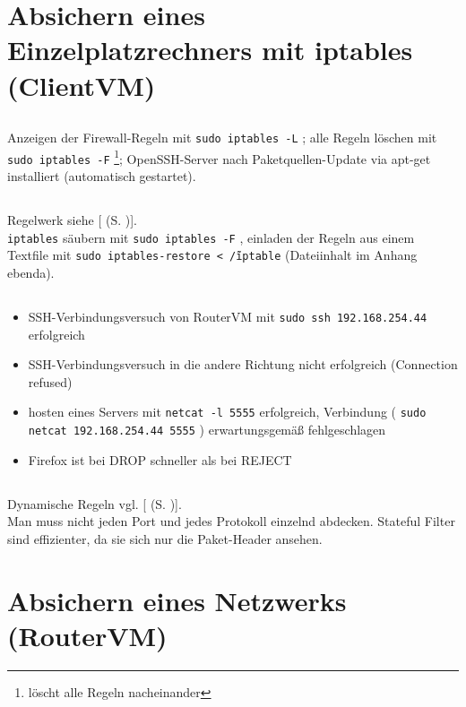 \documentclass[twoside]{article}
\newcommand{\ttt}[1]{%
	\texttt{#1}%
}
\newcommand{\mref}[1]{[\nameref{#1} (S. \pageref{#1})]}
\begin{document}
\section{Absichern eines Einzelplatzrechners mit iptables (ClientVM)}
\label{sec:securing-workplace}
	\subsection{}
	\label{ssec:2.1}
	Anzeigen der Firewall-Regeln mit \ttt{sudo iptables -L}; alle Regeln löschen mit \ttt{sudo iptables -F}\footnote{löscht alle Regeln nacheinander}; OpenSSH-Server nach Paketquellen-Update via apt-get installiert (automatisch gestartet).
	\subsection{}
	\label{ssec:2.2}
	Regelwerk siehe \mref{2.2-1}.\\
	\ttt{iptables} säubern mit \ttt{sudo iptables -F}, einladen der Regeln aus einem Textfile mit \ttt{sudo iptables-restore < \~/iptable} (Dateiinhalt im Anhang ebenda).
	\subsection{}
	\label{ssec:2.3}
	\begin{itemize}
		\item SSH-Verbindungsversuch von RouterVM mit \ttt{sudo ssh 192.168.254.44} erfolgreich
		\item SSH-Verbindungsversuch in die andere Richtung nicht erfolgreich (Connection refused)
		\item hosten eines Servers mit \ttt{netcat -l 5555} erfolgreich, Verbindung (\ttt{sudo netcat 192.168.254.44 5555}) erwartungsgemäß fehlgeschlagen
		\item Firefox ist bei DROP schneller als bei REJECT
	\end{itemize}
	\subsection{}
	\label{ssec:2.4}
	Dynamische Regeln vgl. \mref{2.4-1}.\\
	Man muss nicht jeden Port und jedes Protokoll einzelnd abdecken.
	Stateful Filter sind effizienter, da sie sich nur die Paket-Header ansehen.
\section{Absichern eines Netzwerks (RouterVM)}
\label{sec:securing-network}
\end{document}
